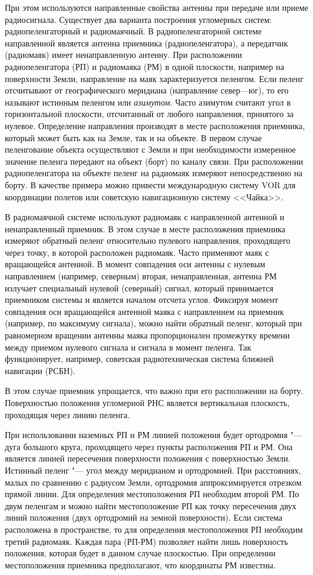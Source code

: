 \documentclass[../main.tex]{subfiles}
\begin{document}
При этом используются направленные свойства антенны при передаче или приеме радиосигнала. Существует два варианта построения угломерных систем: радиопеленгаторный и радиомаячный. В радиопеленгаторной системе направленной является антенна приемника (радиопеленгатора), а передатчик (радиомаяк) имеет ненаправленную антенну. При расположении радиопеленгатора (РП) и радиомаяка (РМ) в одной плоскости, например на поверхности Земли, направление на маяк характеризуется пеленгом. Если пеленг отсчитывают от географического меридиана (направление север—юг), то его называют истинным пеленгом или \textit{азимутом}. Часто азимутом считают угол в горизонтальной плоскости, отсчитанный от любого направления, принятого за нулевое. Определение направления производят в месте расположения приемника, который может быть как на Земле, так и на объекте. В первом случае пеленгование объекта осуществляют с Земли и при необходимости измеренное значение пеленга передают на объект (борт) по каналу связи. При расположении радиопеленгатора на объекте пеленг на радиомаяк измеряют непосредственно на борту. В качестве примера можно привести международную систему VOR для координации полетов или советскую навигационную систему <<Чайка>>.

В радиомаячной системе используют радиомаяк с направленной антенной и ненаправленный приемник. В этом случае в месте расположения приемника измеряют обратный пеленг относительно пулевого направления, проходящего через точку, в которой расположен радиомаяк. Часто применяют маяк с вращающейся антенной. В момент совпадения оси антенны с нулевым направлением (например, северным) вторая, ненаправленная, антенна РМ излучает специальный нулевой (северный) сигнал, который принимается приемником системы и является началом отсчета углов. Фиксируя момент совпадения оси вращающейся антенной маяка с направлением на приемник (например, по максимуму сигнала), можно найти обратный пеленг, который при равномерном вращении антенны маяка пропорционален промежутку времени между приемом нулевого сигнала и сигнала в момент пеленга. Так функционирует, например, советская радиотехническая система ближней навигации (РСБН).

В этом случае приемник упрощается, что важно при его расположении на борту. Поверхностью положения угломерной РНС является вертикальная плоскость, проходящая через линию пеленга.

При использовании наземных РП и РМ линией положения будет ортодромия "--- дуга большого круга, проходящего через пункты расположения РП и РМ. Она является линией пересечения поверхности положения с поверхностью Земли. Истинный пеленг "--- угол между меридианом и ортодромией. При расстояниях, малых по сравнению с радиусом Земли, ортодромия аппроксимируется отрезком прямой линии. Для определения местоположения РП необходим второй РМ. По двум пеленгам и можно найти местоположение РП как точку пересечения двух линий положения (двух ортодромий на земной поверхности). Если система расположена в пространстве, то для определения местоположения РП необходим третий радиомаяк. Каждая пара (РП-РМ) позволяет найти лишь поверхность положения, которая будет в данном случае плоскостью. При определении местоположения приемника предполагают, что координаты РМ известны.
\end{document}
